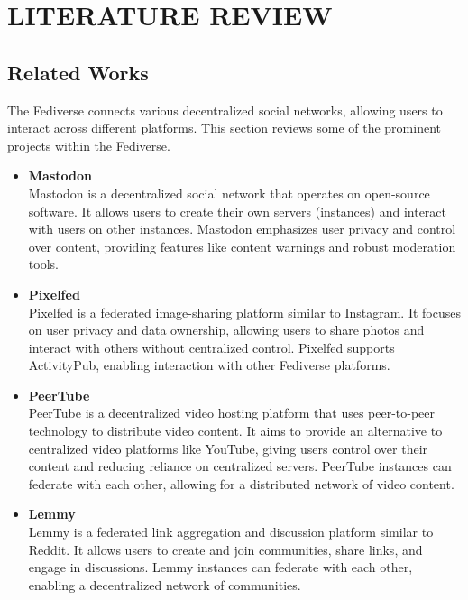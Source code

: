 \chapter{LITERATURE REVIEW}

\section{Related Works}

The Fediverse connects various decentralized social networks, allowing users to interact across different platforms. This section reviews some of the prominent projects within the Fediverse.

\begin{itemize}
  \item \textbf{Mastodon}\cite{mastodon}\\
    Mastodon is a decentralized social network that operates on open-source software. It allows users to create their own servers (instances) and interact with users on other instances. Mastodon emphasizes user privacy and control over content, providing features like content warnings and robust moderation tools.

  \item \textbf{Pixelfed}\cite{pixelfed}\\
    Pixelfed is a federated image-sharing platform similar to Instagram. It focuses on user privacy and data ownership, allowing users to share photos and interact with others without centralized control. Pixelfed supports ActivityPub, enabling interaction with other Fediverse platforms.

  \item \textbf{PeerTube}\cite{peertube}\\
    PeerTube is a decentralized video hosting platform that uses peer-to-peer technology to distribute video content. It aims to provide an alternative to centralized video platforms like YouTube, giving users control over their content and reducing reliance on centralized servers. PeerTube instances can federate with each other, allowing for a distributed network of video content.

  \item \textbf{Lemmy}\cite{lemmy}\\
    Lemmy is a federated link aggregation and discussion platform similar to Reddit. It allows users to create and join communities, share links, and engage in discussions. Lemmy instances can federate with each other, enabling a decentralized network of communities.

\end{itemize}

